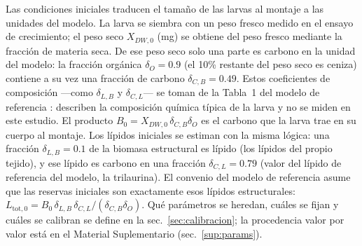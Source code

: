 Las condiciones iniciales traducen el tamaño de las larvas al montaje a las unidades del modelo. La larva se siembra con un peso fresco medido en el ensayo de crecimiento; el peso seco $X_{DW,0}$ (mg) se obtiene del peso fresco mediante la fracción de materia seca. De ese peso seco solo una parte es carbono en la unidad del modelo: la fracción orgánica $\delta_O = 0.9$ (el 10\% restante del peso seco es ceniza) contiene a su vez una fracción de carbono $\delta_{C,B} = 0.49$. Estos coeficientes de composición ---como $\delta_{L,B}$ y $\delta_{C,L}$--- se toman de la Tabla~1 del modelo de referencia \parencite{eriksenDynamicModellingFeed2022}: describen la composición química típica de la larva y no se miden en este estudio. El producto $B_0 = X_{DW,0}\,\delta_{C,B}\delta_O$ es el carbono que la larva trae en su cuerpo al montaje. Los lípidos iniciales se estiman con la misma lógica: una fracción $\delta_{L,B} = 0.1$ de la biomasa estructural es lípido (los lípidos del propio tejido), y ese lípido es carbono en una fracción $\delta_{C,L} = 0.79$ (valor del lípido de referencia del modelo, la trilaurina). El convenio del modelo de referencia asume que las reservas iniciales son exactamente esos lípidos estructurales: $L_{\mathrm{tot},0} = B_0\,\delta_{L,B}\,\delta_{C,L}/(\delta_{C,B}\delta_O)$. Qué parámetros se heredan, cuáles se fijan y cuáles se calibran se define en la sec.~\ref{sec:calibracion}; la procedencia valor por valor está en el Material Suplementario (sec.~\ref{sup:params}).

